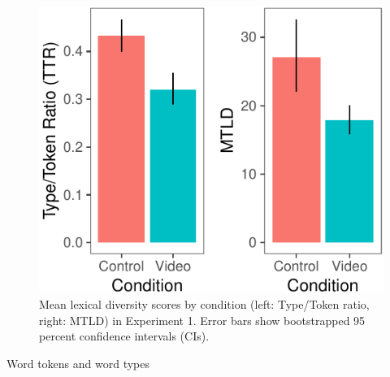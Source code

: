 \documentclass[10pt, letterpaper]{article}
\newenvironment{CodeChunk}{}{}
\begin{document}
\begin{CodeChunk}
\begin{figure}[H]

{\centering \includegraphics{figs/e1lex_div-1} 

}

\caption[Mean lexical diversity scores by condition (left]{Mean lexical diversity scores by condition (left: Type/Token ratio, right: MTLD) in Experiment 1. Error bars show bootstrapped 95 percent confidence intervals (CIs).}\label{fig:e1lex_div}
\end{figure}
\end{CodeChunk}

Word tokens and word types
\end{document}
